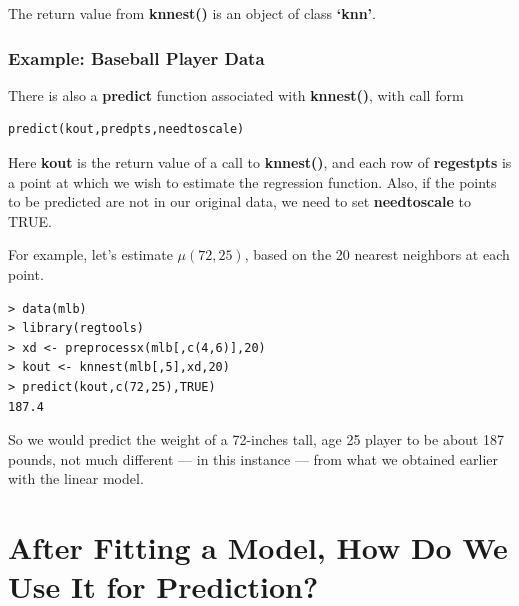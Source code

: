 The return value from {\bf knnest()} is an object of class {\bf `knn'}.

\subsubsection{Example: Baseball Player Data}
\label{knnbaseball}

There is also a {\bf predict} function associated with {\bf knnest()},
with call form

\begin{lstlisting}
predict(kout,predpts,needtoscale)
\end{lstlisting}

Here {\bf kout} is the return value of a call to {\bf knnest()}, and
each row of {\bf regestpts} is a point at which we wish to estimate the
regression function.  Also, if the points to be predicted are not in our
original data, we need to set {\bf needtoscale} to TRUE.

For example, let's estimate $\mu(72,25)$, based on
the 20 nearest neighbors at each point.

\begin{lstlisting}
> data(mlb)
> library(regtools)
> xd <- preprocessx(mlb[,c(4,6)],20)
> kout <- knnest(mlb[,5],xd,20)
> predict(kout,c(72,25),TRUE)
187.4 
\end{lstlisting}


So we would predict the weight of a 72-inches tall, age 25 player to be
about 187 pounds, not much different --- in this instance --- from what
we obtained earlier with the linear model.

\section{After Fitting a Model, How Do We Use It for Prediction?}
\label{afterfit}

